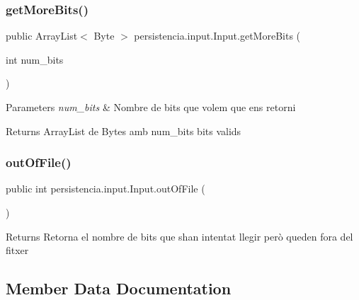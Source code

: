 \subsubsection{\texorpdfstring{get\+More\+Bits()}{getMoreBits()}}
{\footnotesize\ttfamily public Array\+List$<$ Byte $>$ persistencia.\+input.\+Input.\+get\+More\+Bits (\begin{DoxyParamCaption}\item[{int}]{num\+\_\+bits }\end{DoxyParamCaption})\hspace{0.3cm}{\ttfamily [inline]}}


\begin{DoxyParams}{Parameters}
{\em num\+\_\+bits} & Nombre de bits que volem que ens retorni \\
\hline
\end{DoxyParams}
\begin{DoxyReturn}{Returns}
Array\+List de Bytes amb num\+\_\+bits bits valids 
\end{DoxyReturn}
\mbox{\label{classpersistencia_1_1input_1_1Input_a3f0fc057e91430b81f5f2c92f91b8ed7}} 
\subsubsection{\texorpdfstring{out\+Of\+File()}{outOfFile()}}
{\footnotesize\ttfamily public int persistencia.\+input.\+Input.\+out\+Of\+File (\begin{DoxyParamCaption}{ }\end{DoxyParamCaption})\hspace{0.3cm}{\ttfamily [inline]}}

\begin{DoxyReturn}{Returns}
Retorna el nombre de bits que s\textquotesingle{}han intentat llegir però queden fora del fitxer 
\end{DoxyReturn}


\subsection{Member Data Documentation}
\mbox{\label{classpersistencia_1_1input_1_1Input_aa986cd4af0178e1a80f551dcd8936125}} 
